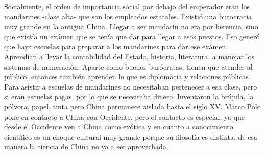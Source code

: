 Socialmente, el orden de importancia social por debajo del emperador eran los mandarines -clase alta- que son los empleados estatales. Existió una burocracia muy grande en la antigua China. Llegar a ser mandarín no era por herencia, sino que existía un exámen que se tenía que dar para llegar a esos puestos. Eso generó que haya escuelas para preparar a los mandarines para dar ese exámen. Aprendían a llevar la contabilidad del Estado, historia, literatura, a manejar los sistemas de numeración. Aparte como buenos burócratas, tienen que atender al público, entonces también aprenden lo que es diplomacia y relaciones públicas. Para asistir a escuelas de mandarines no necesitaban pertenecer a esa clase, pero si eran escuelas pagas, por lo que se necesitaba dinero.
Inventaron la brújula, la pólvora, papel, tinta pero China permanece aislada hasta el siglo XV. Marco Polo pone en contacto a China con Occidente, pero el contacto es especial, ya que desde el Occidente ven a China como exótica y en cuanto a conocimiento científico es un choque cultural muy grande porque su filosofía es distinta, de esa manera la ciencia de China no va a ser aprovechada. 
